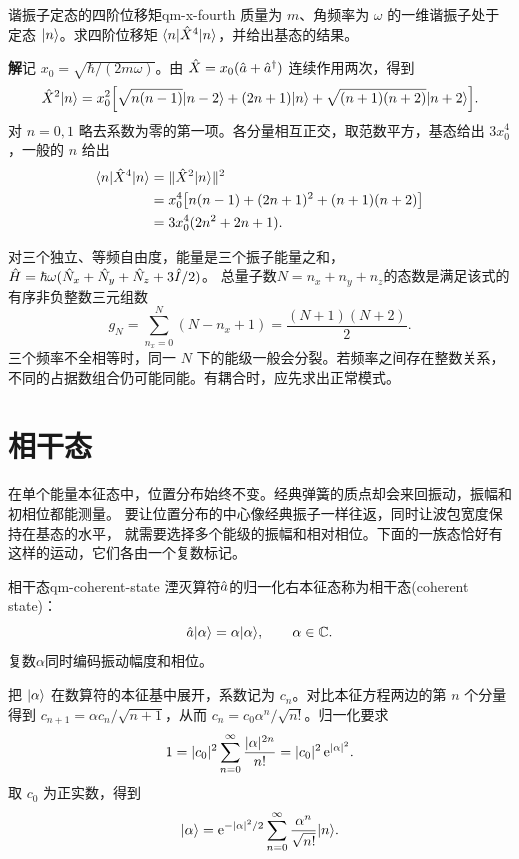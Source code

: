 \begin{example}{谐振子定态的四阶位移矩}{qm-x-fourth}
    质量为 $m$、角频率为 $\omega$ 的一维谐振子处于定态 $\lvert n\rangle$。求四阶位移矩 $\langle n\vert\hat{X}^4\vert n\rangle$，并给出基态的结果。

    \par\smallskip\textbf{解}\quad 记 $x_0 = \sqrt{\hbar/(2m\omega)}$。由 $\hat{X} = x_0(\hat{a} + \hat{a}^\dagger)$ 连续作用两次，得到
    \begin{equation}
        \hat{X}^2\lvert n\rangle = x_0^2\Bigl[
            \sqrt{n(n - 1)}\lvert n - 2\rangle
            + (2n + 1)\lvert n\rangle
            + \sqrt{(n + 1)(n + 2)}\lvert n + 2\rangle\Bigr].
    \end{equation}
    对 $n = 0,1$ 略去系数为零的第一项。各分量相互正交，取范数平方，基态给出 $3x_0^4$，一般的 $n$ 给出
    \begin{equation}
        \begin{alignedat}{1}
            \langle n\vert\hat{X}^4\vert n\rangle &= \|\hat{X}^2\lvert n\rangle\|^2\\
            &= x_0^4\bigl[n(n - 1) + (2n + 1)^2 + (n + 1)(n + 2)\bigr]\\
            &= 3x_0^4(2n^2 + 2n + 1).
        \end{alignedat}
    \end{equation}
\end{example}

对三个独立、等频自由度，能量是三个振子能量之和，$\hat{H} = \hbar\omega(\hat{N}_x + \hat{N}_y + \hat{N}_z + 3\hat{I}/2)$。
总量子数$N = n_x + n_y + n_z$的态数是满足该式的有序非负整数三元组数
\begin{equation}
    g_N = \sum_{n_x=0}^{N}(N - n_x + 1) = \frac{(N + 1)(N + 2)}2.
\end{equation}
三个频率不全相等时，同一 $N$ 下的能级一般会分裂。若频率之间存在整数关系，不同的占据数组合仍可能同能。有耦合时，应先求出正常模式。

\section{相干态}
在单个能量本征态中，位置分布始终不变。经典弹簧的质点却会来回振动，振幅和初相位都能测量。
要让位置分布的中心像经典振子一样往返，同时让波包宽度保持在基态的水平，
就需要选择多个能级的振幅和相对相位。下面的一族态恰好有这样的运动，它们各由一个复数标记。

\begin{definition}{相干态}{qm-coherent-state}
    湮灭算符$\hat{a}$的归一化右本征态称为相干态(coherent state)：
    \begin{equation}
        \hat{a}\lvert\alpha\rangle = \alpha\lvert\alpha\rangle,\qquad \alpha \in \mathbb{C}.
    \end{equation}
    复数$\alpha$同时编码振动幅度和相位。
\end{definition}
把 $\lvert\alpha\rangle$ 在数算符的本征基中展开，系数记为 $c_n$。对比本征方程两边的第 $n$ 个分量得到
$c_{n+1} = \alpha c_n/\sqrt{n + 1}$，从而 $c_n = c_0\alpha^n/\sqrt{n!}$。归一化要求
\[
    1 = \lvert c_0\rvert^2\sum_{n=0}^{\infty}\frac{\lvert\alpha\rvert^{2n}}{n!} = \lvert c_0\rvert^2\mathop{}\!\mathrm{e}^{\lvert\alpha\rvert^2}.
\]
取 $c_0$ 为正实数，得到
\begin{equation}
    \lvert\alpha\rangle = \mathop{}\!\mathrm{e}^{-\lvert\alpha\rvert^2/2}\sum_{n=0}^\infty\frac{\alpha^n}{\sqrt{n!}}\lvert n\rangle.
\end{equation}

